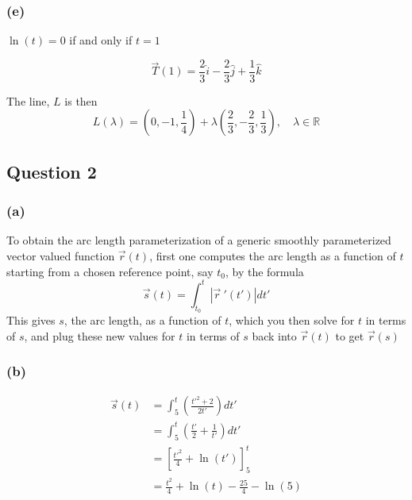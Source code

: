 \documentclass{article}
\begin{document}
\subsubsection*{(e)}
\(\ln(t) = 0\) if and only if \(t = 1\)

\[
\vec{T}(1) = \frac{2}{3} \hat{i} - \frac{2}{3} \hat{j} + \frac{1}{3} \hat{k}
\]

The line, \(L\) is then
\[
L(\lambda) = \left(0, -1 , \frac{1}{4}\right) + \lambda\left(\frac{2}{3}, -\frac{2}{3}, \frac{1}{3}\right), \quad \lambda \in \mathbb{R}
\]


\subsection*{Question 2}
\subsubsection*{(a)}
To obtain the arc length parameterization of a generic smoothly parameterized vector valued function \(\vec{r}(t)\), 
first one computes the arc length as a function of \(t\) starting from a chosen reference point, say \(t_0\), by the 
formula 
\[
\vec{s}(t) = \int_{t_0}^{t} |\vec{r} \ ' (t')|dt'
\]
This gives \(s\), the arc length, as a function of \(t\), which you then solve for \(t\) in terms of \(s\), and plug 
these new values for \(t\) in terms of \(s\) back into \(\vec{r}(t)\) to get \(\vec{r}(s)\)


\subsubsection*{(b)}
\begin{align*}
    \vec{s}(t) &= \int_{5}^{t} \left(\frac{t'^2 + 2}{2t'}\right) dt' \\
    &= \int_{5}^{t} \left(\frac{t'}{2} + \frac{1}{t'}\right) dt' \\
    &= \left[\frac{t'^2}{4} + \ln(t')\right]_5^t \\
    &= \frac{t^2}{4} + \ln(t) - \frac{25}{4} - \ln(5)
\end{align*}

\begin{center}
\end{center}
\end{document}
